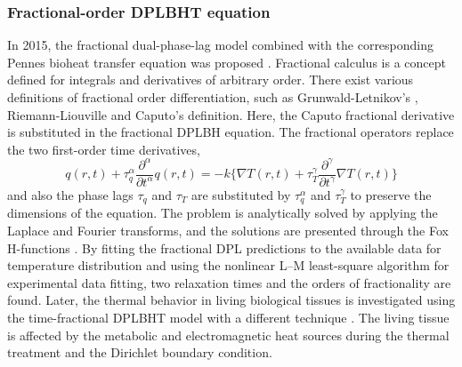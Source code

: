 \documentclass[sn-mathphys]{sn-jnl}%
\theoremstyle{thmstyleone}%
\theoremstyle{thmstyletwo}%
\theoremstyle{thmstylethree}%
\begin{document}
\subsubsection{Fractional-order DPLBHT equation}
In 2015, the fractional dual-phase-lag model combined with the corresponding Pennes bioheat transfer equation was proposed \cite{XH-Y2015}. Fractional calculus is a concept defined for integrals and derivatives of arbitrary order. There exist various definitions of fractional order differentiation, such as Grunwald-Letnikov's \cite{Scherer2011}, Riemann-Liouville and Caputo's \cite{CLi2011} definition. Here, the Caputo fractional derivative is substituted in the fractional DPLBH equation. The fractional operators replace the two first-order time derivatives,
\begin{equation}
\nonumber
q(r,t)+\tau_{q}^{\alpha}\frac{\partial^{\alpha}}{\partial t^{\alpha}}q(r,t)=-k\{\nabla T(r,t)+\tau_{T}^{\gamma}\frac{\partial^{\gamma}}{\partial t^{\gamma}}\nabla T(r,t)\}
\end{equation}
and also the phase lags $\tau_q$ and $\tau_T$ are substituted by $\tau_{q}^{\alpha}$ and $\tau_{T}^{\gamma}$ to preserve the dimensions of the equation. The problem is analytically solved by applying the Laplace and Fourier transforms, and the solutions are presented through the Fox H-functions \cite{Mainardi2005}. By fitting the fractional DPL predictions to the available data for temperature distribution and using the nonlinear L–M least-square algorithm for experimental data fitting, two relaxation times and the orders of fractionality are found. Later, the thermal behavior in living biological tissues is investigated using the time-fractional DPLBHT model with a different technique \cite{Kumar20153,DKumar2017}. The living tissue is affected by the metabolic and electromagnetic heat sources during the thermal treatment and the Dirichlet boundary condition. 
\end{document}
